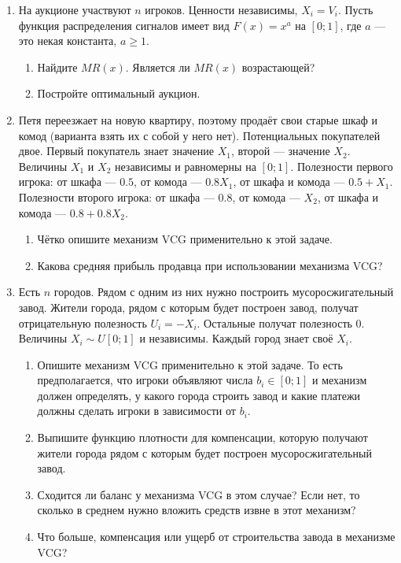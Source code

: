 \begin{enumerate}

\item На аукционе участвуют $ n $ игроков. Ценности независимы, $ X_{i}=V_{i}$. Пусть функция распределения сигналов имеет вид $ F(x)=x^{a} $ на $ [0;1] $, где $ a $ — это некая константа, $ a\geq 1 $.
\begin{enumerate}
\item Найдите $ MR(x) $. Является ли $ MR(x) $ возрастающей?
\item Постройте оптимальный аукцион. 
\end{enumerate}

\item Петя переезжает на новую квартиру, поэтому продаёт свои старые шкаф и комод (варианта взять их с собой у него нет).  Потенциальных покупателей двое. Первый покупатель знает значение $ X_{1} $, второй — значение $ X_{2} $. Величины  $ X_{1} $ и  $ X_{2} $ независимы и равномерны на $ [0;1] $. Полезности первого игрока: от шкафа — $ 0.5 $, от комода — $ 0.8X_{1} $, от шкафа и комода — $ 0.5+X_{1} $. Полезности второго игрока: от шкафа — $ 0.8 $, от комода — $ X_{2} $, от шкафа и комода — $ 0.8+0.8X_{2}$. 
\begin{enumerate}
\item Чётко опишите механизм VCG применительно к этой задаче.
\item Какова средняя прибыль продавца при использовании механизма VCG?
\end{enumerate}

\item Есть $ n $ городов. Рядом с одним из них нужно построить мусоросжигательный завод. Жители города, рядом с которым будет построен завод, получат отрицательную полезность $ U_{i}=-X_{i} $. Остальные получат полезность 0. Величины $ X_{i}\sim U[0;1] $ и независимы. Каждый город знает своё $ X_{i} $.
\begin{enumerate}
\item Опишите механизм VCG применительно к этой задаче. То есть предполагается, что игроки объявляют числа $ b_{i}\in [0;1] $ и механизм должен определять, у какого города строить завод и какие платежи должны сделать игроки в зависимости от $ b_{i} $.
\item Выпишите функцию плотности для компенсации, которую получают жители города рядом с которым будет построен мусоросжигательный завод.
\item Сходится ли баланс у механизма VCG в этом случае? Если нет, то сколько в среднем нужно вложить средств извне в этот механизм?
\item Что больше, компенсация или ущерб от строительства завода в механизме VCG?
\end{enumerate}



\end{enumerate}
